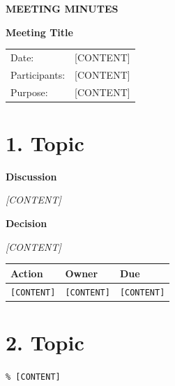 \documentclass[10.5pt,a4paper]{scrartcl}
\begin{document}
{\small\sffamily\bfseries\color{Accent} MEETING MINUTES\par}{\Huge\bfseries Meeting Title\par}
\begin{tabularx}{\linewidth}{@{}lX@{}}Date:&[CONTENT]\\Participants:&[CONTENT]\\Purpose:&[CONTENT]\end{tabularx}
\section*{1. Topic}\textbf{Discussion}\par\emph{[CONTENT]}\par\medskip\textbf{Decision}\par\emph{[CONTENT]}\par\medskip
\begin{tabularx}{\linewidth}{@{}Xll@{}}\toprule Action&Owner&Due\\\midrule \texttt{[CONTENT]}&\texttt{[CONTENT]}&\texttt{[CONTENT]}\\\bottomrule\end{tabularx}
\section*{2. Topic}\texttt{\% [CONTENT]}
\end{document}
